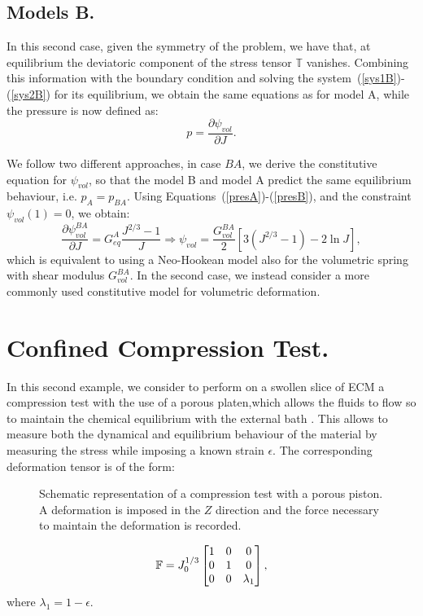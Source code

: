 \subsection{Models B.}
In this second case, given the symmetry of the problem, we have that, at equilibrium the deviatoric component of the stress tensor $\mathbb{T}$ vanishes. Combining this information with the boundary condition and solving the system~(\ref{sys1B})-(\ref{sys2B}) for its equilibrium, we obtain the same equations as for model A, while the pressure is now defined as:
\begin{equation}
p = \frac{\partial \psi_{vol}}{\partial J} .\label{presB}%
\end{equation}

We follow two different approaches, in case $BA$, we derive the constitutive equation for $\psi_{vol}$, so that the model B and model A predict the same equilibrium behaviour, i.e. $p_A=p_{BA}$. Using Equations~(\ref{presA})-(\ref{presB}), and the constraint $\psi_{vol}(1)=0$, we obtain:
\begin{equation}
\frac{\partial \psi^{BA}_{vol}}{\partial J}= G^A_{eq} \frac{J^{2/3}-1}{J} \Longrightarrow \psi_{vol} = \frac{G^{BA}_{vol}}{2}\left[3(J^{2/3} -1) - 2\ln J\right],
\end{equation}
which is equivalent to using a Neo-Hookean model also for the volumetric spring with shear modulus $G^{BA}_{vol}$. In the second case, we instead consider a more commonly used constitutive model for volumetric deformation. 
\section{Confined Compression Test.}

In this second example, we consider to perform on a swollen slice of ECM a compression test with the use of a porous platen,which allows the fluids to flow so to maintain the chemical equilibrium with the external bath \cite{Netti}. This allows to measure both the dynamical and equilibrium behaviour of the material by measuring the stress while imposing a known strain $\epsilon$. The corresponding deformation tensor is of the form:

\begin{figure}[h]
	\centering
	\def\svgwidth{0.89\linewidth}
	
	\vspace{2mm}
	\caption{Schematic representation of a compression test with a porous piston. A deformation is imposed in the $Z$ direction and the force necessary to maintain the deformation is recorded. }
\end{figure}
\begin{equation}
\mathbb{F}=J_0^{1/3}\begin{bmatrix}
1 &0&0\\
0&1&0\\
0&0& \lambda_1
\end{bmatrix},
\label{F} 
\end{equation}
where $\lambda_1 = 1 - \epsilon$. 
